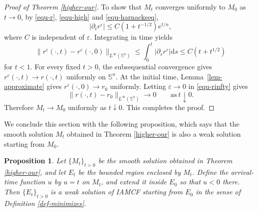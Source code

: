 \documentclass[11pt,reqno]{amsart}
\newtheorem{proposition}{Proposition}[section]
\theoremstyle{definition}
\theoremstyle{remark}
\numberwithin{equation}{section}
\begin{document}
\begin{proof}[Proof of Theorem \ref{higher-our}]
		
		 To show that $M_t$ converges uniformly to $M_0$ as $t\to 0$, by \eqref{equ-r}, \eqref{equ-high} and \eqref{equ-harnackseq},
		\begin{equation*}
			|\partial_t r^{\varepsilon}|\leq C(1+t^{-1/2})e^{t/n},
		\end{equation*}
		where $C$ is independent of $\varepsilon$. Integrating in time yields
		\begin{equation}
			\label{equ-rinfty}
			\|r^{\varepsilon}(\cdot,t)-r^{\varepsilon}(\cdot,0)\|_{L^\infty(\mathbb{S}^n)}\leq \int_0^t |\partial_s r^{\varepsilon}|\mathrm{d}s \leq C(t+t^{1/2})
		\end{equation}
		for $t<1$. For every fixed $t>0$, the subsequential convergence gives $r^{\varepsilon}(\cdot,t)\to r(\cdot,t)$ uniformly on $\mathbb S^n$. At the initial time, Lemma~\ref{lem-approximate} gives $r^{\varepsilon}(\cdot,0)\to r_0$ uniformly. Letting $\varepsilon\to 0$ in \eqref{equ-rinfty} gives
		\begin{equation*}
			\|r(\cdot,t)-r_0\|_{L^\infty(\mathbb S^n)}\to 0 \qquad\text{as}\ t \downarrow 0.
		\end{equation*}
		Therefore $M_t\to M_0$ uniformly as $t\downarrow 0$. This completes the proof.
        \end{proof}

We conclude this section with the following proposition, which says that the smooth solution $M_t$ obtained in Theorem \ref{higher-our} is also a weak solution starting from $M_0$. 
\begin{proposition}
	\label{prop:smooth-continuation-weak}
	Let $\{M_t\}_{t>0}$ be the smooth solution obtained in Theorem \ref{higher-our}, and let $E_t$ be the bounded region enclosed by $M_t$. Define the arrival-time function $u$ by $u=t$ on $M_t$, and extend it inside $E_0$ so that $u<0$ there. Then $\{E_t\}_{t>0}$ is a weak solution of IAMCF starting from $E_0$ in the sense of Definition \ref{def-minimizes}.
\end{proposition}
\end{document}
